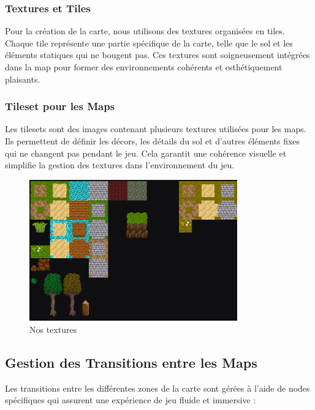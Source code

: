 \subsubsection{Textures et Tiles}

Pour la création de la carte, nous utilisons des textures organisées en tiles.
Chaque tile représente une partie spécifique de la carte, telle que le sol et les éléments statiques qui ne bougent pas.
Ces textures sont soigneusement intégrées dans la map pour former des environnements cohérents et esthétiquement plaisants.

\subsubsection{Tileset pour les Maps}

Les tilesets sont des images contenant plusieurs textures utilisées pour les maps. Ils permettent de définir les décors,
les détails du sol et d'autres éléments fixes qui ne changent pas pendant le jeu. Cela garantit une cohérence visuelle et simplifie
la gestion des textures dans l'environnement du jeu.

\begin{figure}[H]
      \centering
      \includegraphics[width=0.8\textwidth]{assets/tileset.png}
      \caption{Nos textures}
      \label{fig:website1}
\end{figure}

\subsection{Gestion des Transitions entre les Maps}

Les transitions entre les différentes zones de la carte sont gérées à l'aide de nodes spécifiques qui assurent une expérience de jeu fluide et immersive :

